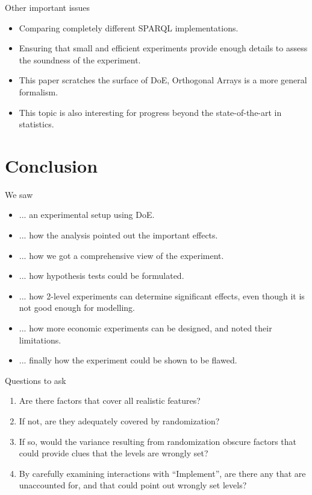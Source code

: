 \documentclass[english,handout,aspectratio=169]{ifislide}
\begin{document}
\begin{frame}{Other important issues}

  \begin{itemize}
  \item Comparing completely different SPARQL implementations.
  \item Ensuring that small and efficient experiments provide enough
    details to assess the soundness of the experiment.
  \item This paper scratches the surface of DoE, Orthogonal Arrays is
    a more general formalism.
  \item This topic is also interesting for progress beyond the
    state-of-the-art in statistics.
  \end{itemize}
  
\end{frame}

\section{Conclusion}

\begin{frame}
We saw
  \begin{itemize}
  \item ... an experimental setup using DoE.
  \item ... how the analysis pointed out the important effects.
  \item ... how we got a comprehensive view of the experiment.
  \item ... how hypothesis tests could be formulated.
  \item ... how 2-level experiments can determine significant effects,
    even though it is not good enough for modelling.
  \item ... how more economic experiments can be designed, and noted
    their limitations.
  \item ... finally how the experiment could be shown to be flawed.
  \end{itemize}
\end{frame}

\begin{frame}{Questions to ask}

\begin{enumerate}
\item Are there factors that cover all realistic features?
\item If not, are they adequately covered by randomization?
\item If so, would the variance resulting from randomization obscure
  factors that could provide clues that the levels are wrongly set?
\item By carefully examining interactions with ``Implement'', are
  there any that are unaccounted for, and that could point out wrongly
  set levels?
\end{enumerate}

  
\end{frame}
\end{document}
